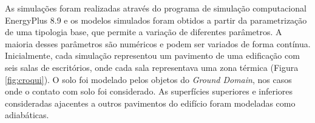 \documentclass[brazil,hardcopy,openany,a5paper]{ufscthesis}
\begin{document}
%		

		As simulações foram realizadas através do programa de simulação computacional EnergyPlus 8.9 \cite{EnergyPlus2018} e os modelos simulados foram obtidos a partir da parametrização de uma tipologia base, que permite a variação de diferentes parâmetros.  %
		A maioria desses parâmetros são numéricos e podem ser variados de forma contínua. 
		Inicialmente, cada simulação representou um pavimento de uma edificação com seis salas de escritórios, onde cada sala representava uma zona térmica (Figura \ref{fig:croqui}).
		O solo foi modelado pelos objetos do \textit{Ground Domain}, nos casos onde o contato com solo foi considerado. As superfícies superiores e inferiores consideradas ajacentes a outros pavimentos do edifício foram modeladas como adiabáticas.
		
\end{document}
